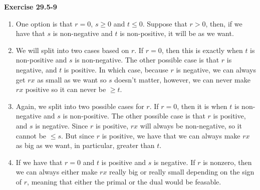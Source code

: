 \documentclass{article}
\begin{document}
\noindent\textbf{Exercise 29.5-9}\\
\begin{enumerate}[1.]
\item
One option is that $r= 0$, $s\ge 0$ and $t\le 0$. Suppose that $r>0$, then, if we have that $s$ is non-negative and $t$ is non-positive, it will be as we want. 
\item
We will split into two cases based on $r$. If $r=0$, then this is exactly when $t$ is non-positive and $s$ is non-negative.
The other possible case is that $r$ is negative, and $t$ is positive. In which case, because $r$ is negative, we can always get $rx$ as small as we want so $s$ doesn't matter, however, we can never make $rx$ positive so it can never be $\ge t$.
\item
Again, we split into two possible cases for $r$. If $r=0$, then it is when $t$ is non-negative and $s$ is non-positive. The other possible case is that $r$ is positive, and $s$ is negative. Since $r$ is positive, $rx$ will always be non-negative, so it cannot be $\le s$. But since $r$ is positive, we have that we can always make $rx$ as big as we want, in particular, greater than $t$.
\item
If we have that $r=0$ and $t$ is positive and $s$ is negative. If $r$ is nonzero, then we can always either make $rx$ really big or really small depending on the sign of $r$, meaning that either the primal or the dual would be feasable.

\end{enumerate}
\end{document}
